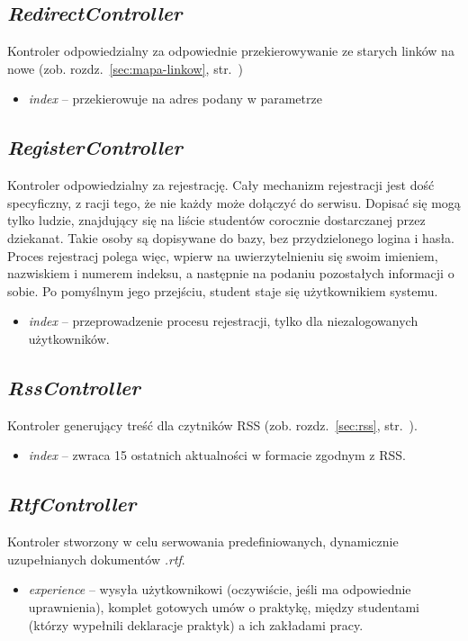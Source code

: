 \documentclass[a4paper,12pt,oneside]{report}
\begin{document}
\subsection{\emph{RedirectController}}
\label{con:redirect}
  Kontroler odpowiedzialny za odpowiednie przekierowywanie ze starych linków na nowe (zob. rozdz.~\ref{sec:mapa-linkow}, str.~\pageref{sec:mapa-linkow})
\begin{itemize}
  \item \emph{index} -- przekierowuje na adres podany w parametrze
\end{itemize}

\subsection{\emph{RegisterController}}
\label{con:register}
  Kontroler odpowiedzialny za rejestrację. Cały mechanizm rejestracji jest dość specyficzny, z racji tego, że nie każdy może dołączyć do serwisu. Dopisać się mogą tylko ludzie, znajdujący się na liście studentów corocznie dostarczanej przez dziekanat. Takie osoby są dopisywane do bazy, bez przydzielonego logina i hasła. Proces rejestracj polega więc, wpierw na uwierzytelnieniu się swoim imieniem, nazwiskiem i numerem indeksu, a następnie na podaniu pozostałych informacji o sobie. Po pomyślnym jego przejściu, student staje się użytkownikiem systemu.
\begin{itemize}
  \item \emph{index} -- przeprowadzenie procesu rejestracji, tylko dla niezalogowanych użytkowników.
\end{itemize}

\subsection{\emph{RssController}}
\label{con:rss}
  Kontroler generujący treść dla czytników RSS (zob. rozdz.~\ref{sec:rss}, str.~\pageref{sec:rss}).

\begin{itemize}
  \item \emph{index} -- zwraca 15 ostatnich aktualności w formacie zgodnym z RSS.
\end{itemize}

\subsection{\emph{RtfController}}
\label{con:rtf}
  Kontroler stworzony w celu serwowania predefiniowanych, dynamicznie uzupełnianych dokumentów \emph{.rtf}.
\begin{itemize}
  \item \emph{experience} -- wysyła użytkownikowi (oczywiście, jeśli ma odpowiednie uprawnienia), komplet gotowych umów o praktykę, między studentami (którzy wypełnili deklaracje praktyk) a ich zakładami pracy.
\end{itemize}
\end{document}
